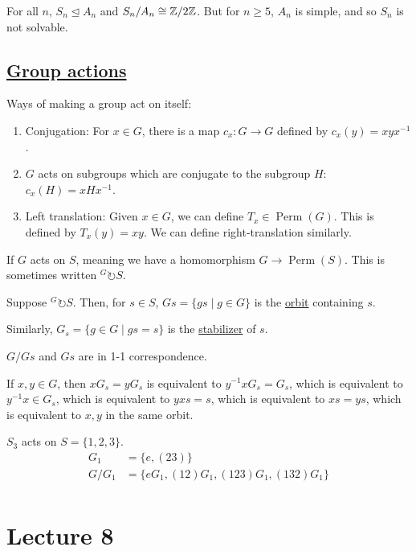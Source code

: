 \documentclass[x11names,reqno,14pt]{extarticle}
\DeclareMathOperator{\Perm}{Perm}
\begin{document}
For all $n$, $S_n\unlhd A_n$ and $S_n/A_n \cong \mathbb{Z}/2\mathbb{Z}$. But for $n \geq 5$, $A_n$ is simple, and so $S_n$ is not solvable. 

\subsection*{\underline{Group actions}}

Ways of making a group act on itself:
\begin{enumerate}
\item Conjugation: For $x \in G$, there is a map $c_x:G\to G$ defined by $c_x(y) = xyx^{-1}$. 
\item $G$ acts on subgroups which are conjugate to the subgroup $H$: $c_x(H) = xHx^{-1}$. 
\item Left translation: Given $x \in G$, we can define $T_x\in \Perm(G)$. This is defined by $T_x(y) = xy$. We can define right-translation similarly. 
\end{enumerate}

If $G$ acts on $S$, meaning we have a homomorphism $G\to\Perm(S)$. This is sometimes written ${}^G\circlearrowright S$. 


Suppose ${}^G\circlearrowright S$. Then, for $s \in S$, $Gs = \{gs \mid g \in G\}$ is the \underline{orbit} containing $s$. 

Similarly, $G_s = \{g \in G \mid gs = s\}$ is the \underline{stabilizer} of $s$. 

\claim 

$G/Gs$ and $Gs$ are in 1-1 correspondence. 

\proof

If $x, y \in G$, then $xG_s = yG_s$ is equivalent to $y^{-1}x G_s = G_s$, which is equivalent to $y^{-1}x \in G_s$, which is equivalent to $yxs = s$, which is equivalent to $xs = ys$, which is equivalent to $x, y$ in the same orbit. 

\exm

$S_3$ acts on $S = \{1, 2, 3\}$. 
\begin{align*}
G_1 & = \{e, (23)\} \\
G/G_1 & = \{eG_1, (12)G_1, (123)G_1, (132)G_1\} \\
\end{align*}

\section*{Lecture 8}
\end{document}
